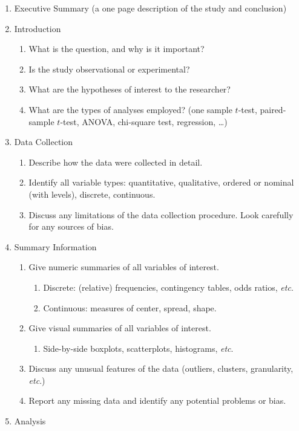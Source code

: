\documentclass[captions=tableheading]{scrbook}
\begin{document}
\begin{example}
\begin{enumerate}
\item Executive Summary (a one page description of the study and conclusion)
\item Introduction
\begin{enumerate}
\item What is the question, and why is it important?
\item Is the study observational or experimental?
\item What are the hypotheses of interest to the researcher?
\item What are the types of analyses employed? (one sample \(t\)-test, paired-sample \(t\)-test, ANOVA, chi-square test, regression, \ldots{})
\end{enumerate}
\item Data Collection
\begin{enumerate}
\item Describe how the data were collected in detail.
\item Identify all variable types: quantitative, qualitative, ordered or nominal (with levels), discrete, continuous.
\item Discuss any limitations of the data collection procedure. Look carefully for any sources of bias.
\end{enumerate}
\item Summary Information
\begin{enumerate}
\item Give numeric summaries of all variables of interest.
\begin{enumerate}
\item Discrete: (relative) frequencies, contingency tables, odds ratios, \emph{etc}.
\item Continuous: measures of center, spread, shape.
\end{enumerate}
\item Give visual summaries of all variables of interest.
\begin{enumerate}
\item Side-by-side boxplots, scatterplots, histograms, \emph{etc}.
\end{enumerate}
\item Discuss any unusual features of the data (outliers, clusters, granularity, \emph{etc}.)
\item Report any missing data and identify any potential problems or bias.
\end{enumerate}
\item Analysis

\end{enumerate}
\end{example}
\end{document}
